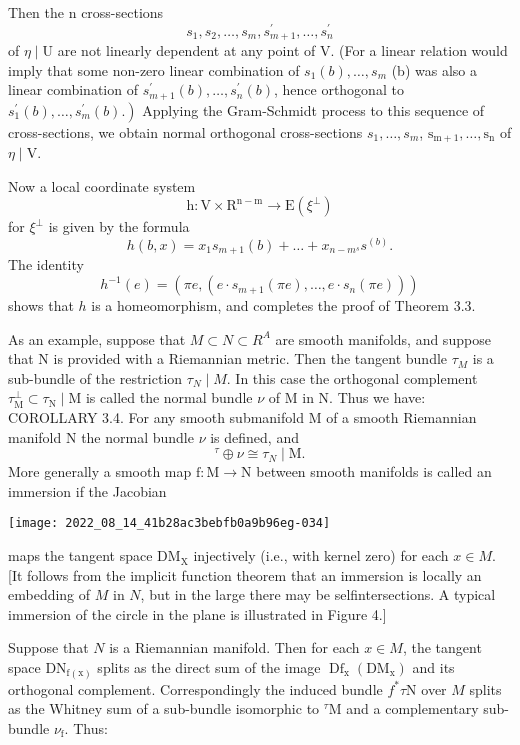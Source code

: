 \documentclass[10pt]{article}
\begin{document}
Then the $\mathrm{n}$ cross-sections
$$
s_{1}, s_{2}, \ldots, s_{m}, s_{m+1}^{\prime}, \ldots, s_{n}^{\prime}
$$
of $\eta \mid \mathrm{U}$ are not linearly dependent at any point of $\mathrm{V}$. (For a linear relation would imply that some non-zero linear combination of $s_{1}(b), \ldots, s_{m}$ (b) was also a linear combination of $s_{m+1}^{\prime}(b), \ldots, s_{n}^{\prime}(b)$, hence orthogonal to $\left.s_{1}^{\prime}(b), \ldots, s_{m}^{\prime}(b) .\right)$ Applying the Gram-Schmidt process to this sequence of cross-sections, we obtain normal orthogonal cross-sections $s_{1}, \ldots, s_{m}$, $\mathrm{s}_{\mathrm{m}+1}, \ldots, \mathrm{s}_{\mathrm{n}}$ of $\eta \mid \mathrm{V}$.

Now a local coordinate system
$$
\mathrm{h}: \mathrm{V} \times \mathrm{R}^{\mathrm{n}-\mathrm{m}} \rightarrow \mathrm{E}\left(\xi^{\perp}\right)
$$
for $\xi^{\perp}$ is given by the formula
$$
h(b, x)=x_{1} s_{m+1}(b)+\ldots+x_{n-m^{s}} s^{(b)} .
$$
The identity
$$
h^{-1}(e)=\left(\pi e,\left(e \cdot s_{m+1}(\pi e), \ldots, e \cdot s_{n}(\pi e)\right)\right)
$$
shows that $h$ is a homeomorphism, and completes the proof of Theorem 3.3.

As an example, suppose that $M \subset N \subset R^{A}$ are smooth manifolds, and suppose that $\mathrm{N}$ is provided with a Riemannian metric. Then the tangent bundle $\tau_{M}$ is a sub-bundle of the restriction $\tau_{N} \mid M$. In this case the orthogonal complement $\tau_{\mathrm{M}}^{\perp} \subset \tau_{\mathrm{N}} \mid \mathrm{M}$ is called the normal bundle $\nu$ of $\mathrm{M}$ in $\mathrm{N}$. Thus we have: COROLLARY 3.4. For any smooth submanifold M of a smooth Riemannian manifold $\mathrm{N}$ the normal bundle $\nu$ is defined, and
$$
{ }^{\tau} \oplus \nu \cong \tau_{N} \mid \mathrm{M} .
$$
More generally a smooth map $\mathrm{f}: \mathrm{M} \rightarrow \mathrm{N}$ between smooth manifolds is called an immersion if the Jacobian

\texttt{[image: 2022\_08\_14\_41b28ac3bebfb0a9b96eg-034]}

maps the tangent space $\mathrm{DM}_{\mathrm{X}}$ injectively (i.e., with kernel zero) for each $x \in M$. [It follows from the implicit function theorem that an immersion is locally an embedding of $M$ in $N$, but in the large there may be selfintersections. A typical immersion of the circle in the plane is illustrated in Figure 4.]

Suppose that $N$ is a Riemannian manifold. Then for each $x \in M$, the tangent space $\mathrm{DN}_{\mathrm{f}(\mathrm{x})}$ splits as the direct sum of the image $\operatorname{Df}_{\mathrm{x}}\left(\mathrm{DM}_{\mathrm{x}}\right)$ and its orthogonal complement. Correspondingly the induced bundle $f^{*} \tau \mathrm{N}$ over $M$ splits as the Whitney sum of a sub-bundle isomorphic to ${ }^{\tau} \mathrm{M}$ and a complementary sub-bundle $\nu_{\mathrm{f}}$. Thus:
\end{document}
